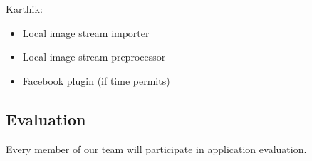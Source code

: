 \documentclass[conference]{IEEEtran}
\begin{document}
Karthik:
\begin{itemize}
	\item Local image stream importer
	\item Local image stream preprocessor
	\item Facebook plugin (if time permits)
\end{itemize}

\subsection{Evaluation}

Every member of our team will participate in application evaluation.



\end{document}
